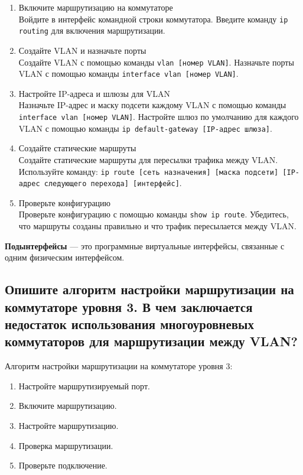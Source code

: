 \begin{enumerate}
	\item Включите маршрутизацию на коммутаторе\\
		Войдите в интерфейс командной строки коммутатора.
		Введите команду \texttt{ip routing} для включения маршрутизации.
	\item Создайте VLAN и назначьте порты\\
		Создайте VLAN с помощью команды \texttt{vlan [номер VLAN]}.
		Назначьте порты VLAN с помощью команды
		\texttt{interface vlan [номер VLAN]}.
	\item Настройте IP-адреса и шлюзы для VLAN\\
		Назначьте IP-адрес и маску подсети каждому VLAN с помощью 
		команды \texttt{interface vlan [номер VLAN]}.
		Настройте шлюз по умолчанию для каждого VLAN с помощью 
		команды \texttt{ip default-gateway [IP-адрес шлюза]}.
	\item Создайте статические маршруты\\
		Создайте статические маршруты для пересылки трафика между VLAN.
		Используйте команду:
		\texttt{ip route [сеть назначения] [маска подсети] 
		[IP-адрес следующего перехода] [интерфейс]}.
	\item Проверьте конфигурацию\\
		Проверьте конфигурацию с помощью команды \texttt{show ip route}.
		Убедитесь, что маршруты созданы правильно и что трафик 
		пересылается между VLAN.
\end{enumerate}

\textbf{Подынтерфейсы} --- это программные виртуальные интерфейсы, 
связанные с одним физическим интерфейсом.

\subsection{Опишите алгоритм настройки маршрутизации на коммутаторе 
	уровня 3. В чем заключается недостаток использования 
	многоуровневых коммутаторов для маршрутизации между 
	VLAN?}

Алгоритм настройки маршрутизации на коммутаторе уровня 3:

\begin{enumerate}
	\item Настройте маршрутизируемый порт.
	\item Включите маршрутизацию.
	\item Настройте маршрутизацию.
	\item Проверка маршрутизации.
	\item Проверьте подключение.
\end{enumerate}

